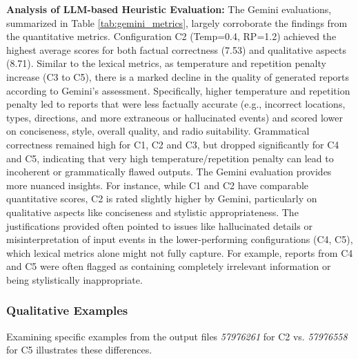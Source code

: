 \documentclass[fleqn,moreauthors,10pt]{ds_report}
\begin{document}
\textbf{Analysis of LLM-based Heuristic Evaluation:}
The Gemini evaluations, summarized in Table \ref{tab:gemini_metrics}, largely corroborate the findings from the quantitative metrics. Configuration C2 (Temp=0.4, RP=1.2) achieved the highest average scores for both factual correctness (7.53) and qualitative aspects (8.71). Similar to the lexical metrics, as temperature and repetition penalty increase (C3 to C5), there is a marked decline in the quality of generated reports according to Gemini's assessment. Specifically, higher temperature and repetition penalty led to reports that were less factually accurate (e.g., incorrect locations, types, directions, and more extraneous or hallucinated events) and scored lower on conciseness, style, overall quality, and radio suitability. Grammatical correctness remained high for C1, C2 and C3, but dropped significantly for C4 and C5, indicating that very high temperature/repetition penalty can lead to incoherent or grammatically flawed outputs.
The Gemini evaluation provides more nuanced insights. For instance, while C1 and C2 have comparable quantitative scores, C2 is rated slightly higher by Gemini, particularly on qualitative aspects like conciseness and stylistic appropriateness. The justifications provided often pointed to issues like hallucinated details or misinterpretation of input events in the lower-performing configurations (C4, C5), which lexical metrics alone might not fully capture. For example, reports from C4 and C5 were often flagged as containing completely irrelevant information or being stylistically inappropriate.

\subsubsection*{Qualitative Examples}
Examining specific examples from the output files \textit{57976261} for C2 vs. \textit{57976558} for C5 illustrates these differences.
\end{document}
